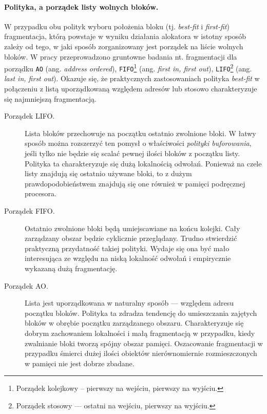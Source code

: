 \documentclass[12pt,a4paper,titlepage,twoside]{mwart}
\begin{document}
\paragraph{Polityka, a porządek listy wolnych bloków.}

W przypadku obu polityk wyboru położenia bloku (tj. \textit{best-fit} i
\textit{first-fit}) fragmentacja, którą powstaje w wyniku działania alokatora
w istotny sposób zależy od tego, w jaki sposób zorganizowany jest porządek na
liście wolnych bloków. W pracy \cite{johnstone98memory} przeprowadzono
gruntowne badania nt.  fragmentacji dla porządku \texttt{AO} (ang.
\textit{address ordered}), \texttt{FIFO}\footnote{Porządek kolejkowy --
pierwszy na wejściu, pierwszy na wyjściu.} (ang.  \textit{first in, first
out}), \texttt{LIFO}\footnote{Porządek stosowy --- ostatni na wejściu, pierwszy
na wyjściu.} (ang.  \textit{last in, first out}). Okazuje się, że praktycznych
zastosowaniach polityka \textit{best-fit} w połączeniu z listą uporządkowaną
względem adresów lub stosowo charakteryzuje się najmniejszą fragmentacją.
\vspace{-1ex}

\begin{description}

\item[Porządek LIFO.] Lista bloków przechowuje na początku ostatnio zwolnione
bloki. W łatwy sposób można rozszerzyć ten pomysł o właściwości
\textit{polityki buforowania}, jeśli tylko nie będzie się scalać pewnej ilości
bloków z początku listy. Polityka ta charakteryzuje się dużą lokalnością
odwołań. Ponieważ na czele listy znajdują się ostatnio używane bloki, to z dużym
prawdopodobieństwem znajdują się one również w pamięci podręcznej procesora.

\vspace{1ex}

\item[Porządek FIFO.] Ostatnio zwolnione bloki będą umiejscawiane na końcu
kolejki. Cały zarządzany obszar będzie cyklicznie przeglądany. Trudno
stwierdzić praktyczną przydatność takiej polityki. Wydaje się ona być mało
interesująca ze względu na niską lokalność odwołań i empirycznie wykazaną
dużą fragmentację.

\vspace{1ex}

\item[Porządek AO.] Lista jest uporządkowana w naturalny sposób --- względem
adresu początku bloków. Polityka ta zdradza tendencję do umieszczania zajętych
bloków w obrębie początku zarządzanego obszaru. Charakteryzuje się dobrym
zachowaniem lokalności i małą fragmentacją w przypadku, kiedy zwalnianie bloki
tworzą spójny obszar pamięci. Oszacowanie fragmentacji w przypadku śmierci
dużej ilości obiektów nierównomiernie rozmieszczonych w pamięci nie jest dobrze
zbadane.
\end{description}
\end{document}
